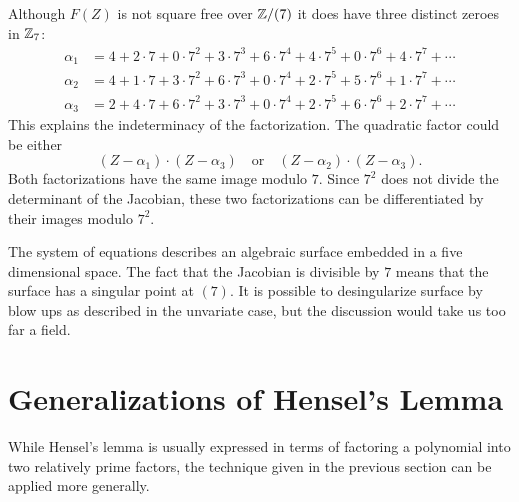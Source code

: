 \label{PolyZ7:SQFR:Ex}
Although $F(Z)$ is not square free over $\mathbb{Z}/(7)$ it does have three
distinct zeroes in $\mathbb{Z}_7$:
\[
\begin{aligned}
\alpha_1 & = 4 + 2\cdot 7 + 0\cdot 7^2 + 3\cdot 7^3 + 6\cdot 7^4 +
4\cdot 7^5 + 0\cdot 7^6 + 4\cdot 7^7 + \cdots \\
\alpha_2 & = 4 + 1\cdot7 + 3\cdot7^2 + 6\cdot7^3 + 0\cdot7^4 + 2\cdot7^5
+ 5\cdot7^6 + 1\cdot7^7 + \cdots \\
\alpha_3 & = 2 + 4\cdot7 + 6\cdot7^2 + 3\cdot7^3 + 0\cdot7^4 +
2\cdot7^5 + 6\cdot7^6 + 2\cdot7^7 + \cdots
\end{aligned}
\]
This explains the indeterminacy of the factorization.  The quadratic
factor could be either
\[
(Z - \alpha_1) \cdot (Z - \alpha_3) \quad\mbox{or}\quad
(Z - \alpha_2) \cdot (Z - \alpha_3).
\]
Both factorizations have the same image modulo $7$.  Since $7^2$ does
not divide the determinant of the Jacobian, these two factorizations
can be differentiated by their images modulo $7^2$.

The system of equations  describes an
algebraic surface embedded in a five dimensional space.  The fact that
the Jacobian is divisible by $7$ means that the surface has a singular
point at $(7)$.  It is possible to desingularize surface by blow ups
as described in the unvariate case,  but the discussion would take us too far a field.


\section{Generalizations of Hensel's Lemma}
\label{General:Hensel:Sec}

While Hensel's lemma is usually expressed in terms of factoring a
polynomial into two relatively prime factors, the technique given in
the previous section can be applied more generally. 


